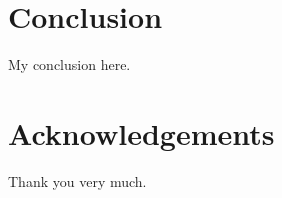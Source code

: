 \documentclass[11pt,a4paper,onecolumn,oneside]{report}
\begin{document}
\newpage 
\section{Conclusion} 
My conclusion here.

\clearpage



\clearpage

\section*{\hfill \Large Acknowledgements \hfill}
Thank you very much.
\clearpage


\hbox{ }
\thispagestyle{empty}
\clearpage
\end{document}
